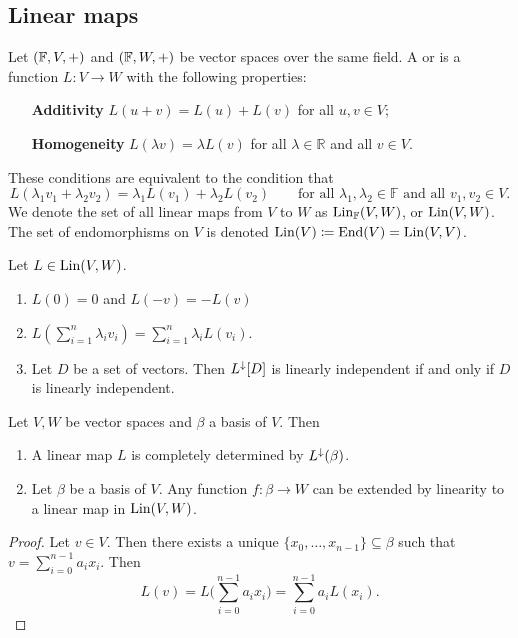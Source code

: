 \subsection{Linear maps}
\begin{definition}
Let $(\mathbb{F}, V, +)$ and $(\mathbb{F}, W, +)$ be vector spaces over the same field. A  or  is a function $L:V\to W$ with the following properties:
\begin{itemize}[leftmargin=3cm]
\item[\textbf{Additivity}] $L(u+v) = L(u)+L(v)$ for all $u,v \in V$;
\item[\textbf{Homogeneity}] $L(\lambda v) = \lambda L(v)$ for all $\lambda \in \mathbb{R}$ and all $v\in V$.
\end{itemize}
These conditions are equivalent to the condition that
\[ L(\lambda_1 v_1 + \lambda_2v_2) = \lambda_1L(v_1) + \lambda_2 L(v_2) \qquad \text{for all $\lambda_1,\lambda_2\in \mathbb{F}$ and all $v_1,v_2\in V$.} \]
We denote the set of all linear maps from $V$ to $W$ as $\operatorname{Lin}_\mathbb{F}(V,W)$, or $\operatorname{Lin}(V,W)$. The set of endomorphisms on $V$ is denoted $\operatorname{Lin}(V) \coloneqq \operatorname{End}(V) = \operatorname{Lin}(V,V)$.
\end{definition}

\begin{lemma} \label{linearMaps}
Let $L\in \operatorname{Lin}(V,W)$.
\begin{enumerate}
\item $L(0) = 0$ and $L(-v) = -L(v)$
\item $L\left(\sum^n_{i=1}\lambda_i v_i\right) = \sum_{i=1}^n\lambda_i L(v_i)$.
\item Let $D$ be a set of vectors. Then $L^\downarrow[D]$ is linearly independent \textup{if and only if} $D$ is linearly independent.
\end{enumerate}
\end{lemma}

\begin{proposition} \label{linearMapsDeterminedByBasis}
Let $V,W$ be vector spaces and $\beta$ a basis of $V$. Then
\begin{enumerate}
\item A linear map $L$ is completely determined by $L^\downarrow(\beta)$.
\item Let $\beta$ be a basis of $V$. Any function $f: \beta \to W$ can be extended by linearity to a linear map in $\operatorname{Lin}(V,W)$.
\end{enumerate}
\end{proposition}
\begin{proof}
Let $v\in V$. Then there exists a unique $\{x_0, \ldots, x_{n-1}\}\subseteq \beta$ such that $v = \sum_{i=0}^{n-1} a_ix_i$. Then
\[ L(v) = L\Big(\sum_{i=0}^{n-1} a_ix_i\Big) = \sum_{i=0}^{n-1}a_i L(x_i). \]
\end{proof}

